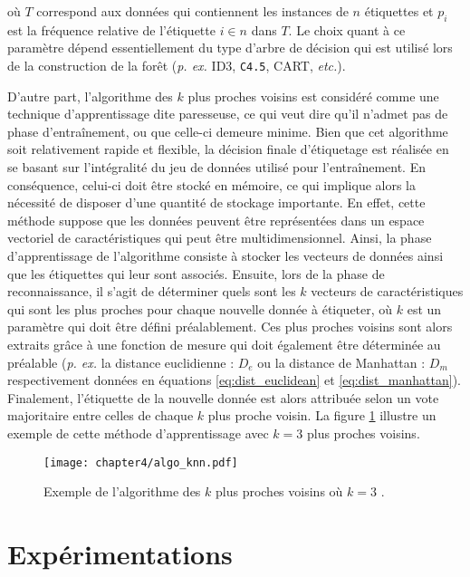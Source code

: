 \noindent où $T$ correspond aux données qui contiennent les instances de $n$ étiquettes et $p_i$ est la fréquence relative de l'étiquette $i \in n$ dans $T$. Le choix quant à ce paramètre dépend essentiellement du type d'arbre de décision qui est utilisé lors de la construction de la forêt (\textit{p. ex.} ID3, \texttt{C4.5}, CART, \textit{etc.}).

D'autre part, l'algorithme des $k$ plus proches voisins est considéré comme une technique d'apprentissage dite \og{}paresseuse\fg{}, ce qui veut dire qu'il n'admet pas de phase d'entraînement, ou que celle-ci demeure minime. Bien que cet algorithme soit relativement rapide et flexible, la décision finale d'étiquetage est réalisée en se basant sur l'intégralité du jeu de données utilisé pour l'entraînement. En conséquence, celui-ci doit être stocké en mémoire, ce qui implique alors la nécessité de disposer d'une quantité de stockage importante. En effet, cette méthode suppose que les données peuvent être représentées dans un espace vectoriel de caractéristiques qui peut être multidimensionnel. Ainsi, la phase d'apprentissage de l'algorithme consiste à stocker les vecteurs de données ainsi que les étiquettes qui leur sont associés. Ensuite, lors de la phase de reconnaissance, il s'agit de déterminer quels sont les $k$ vecteurs de caractéristiques qui sont les plus proches pour chaque nouvelle donnée à étiqueter, où $k$ est un paramètre qui doit être défini préalablement. Ces plus proches voisins sont alors extraits grâce à une fonction de mesure qui doit également être déterminée au préalable (\textit{p. ex.} la distance euclidienne : $D_e$ ou la distance de Manhattan : $D_m$ respectivement données en équations \ref{eq:dist_euclidean} et \ref{eq:dist_manhattan}). Finalement, l'étiquette de la nouvelle donnée est alors attribuée selon un vote majoritaire entre celles de chaque $k$ plus proche voisin. La figure \ref{fig:algo_knn} illustre un exemple de cette méthode d'apprentissage avec $k=3$ plus proches voisins.

\begin{figure}[H]
	\centering
	\texttt{[image: chapter4/algo\_knn.pdf]}
        \caption[Exemple de l'algorithme des $k$ plus proches voisins où $k=3$.]{Exemple de l'algorithme des $k$ plus proches voisins où $k=3$ \citep{Thullier2017}.}
	\label{fig:algo_knn}
\end{figure}

\section{Expérimentations}
\label{sec:expe}

